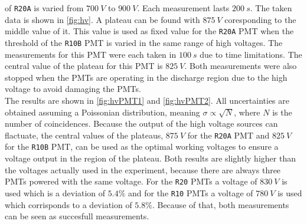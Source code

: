 of \texttt{R20A} is varied from $\SI{700}{V}$ to $\SI{900}{V}$. Each measurement lasts $\SI{200}{s}$.
The taken data is shown in \autoref{fig:hv}. A plateau can be found with $\SI{875}{V}$ coresponding to the middle value 
of it. This value is used as fixed value for the \texttt{R20A} PMT when the threshold of the \texttt{R10B}
PMT is varied in the same range of high voltages. The measurements for this PMT were each taken in $\SI{100}{s}$ due to 
time limitations.
The central value of the plateau for this PMT is $\SI{825}{V}$.
Both measurements were also stopped when the PMTs are operating in the discharge region due to the high voltage to 
avoid damaging the PMTs.\\
The results are shown in \autoref{fig:hvPMT1} and \autoref{fig:hvPMT2}. All uncertainties are obtained 
assuming a Poissonian distribution, meaning $\sigma \propto \sqrt{N}$, where $N$ is the number of
coincidences. Because the output of the high voltage sources can flactuate, the central values of the plateaus, $\SI{875}{V}$ for the \texttt{R20A} PMT and 
$\SI{825}{V}$ for the \texttt{R10B} PMT, can be used as the optimal working voltages to ensure
a voltage output in the region of the plateau. Both results are slightly higher than the voltages actually used
in the experiment, because there are always three PMTs powered with the same 
voltage. For the \texttt{R20} PMTs a voltage of $\SI{830}{V}$ is used which is a deviation of $5.4\%$
and for the \texttt{R10} PMTs a voltage of $\SI{780}{V}$ is used which corrisponds to a deviation of 
$5.8\%$. Because of that, both measurements can be seen as succesfull measurements.

